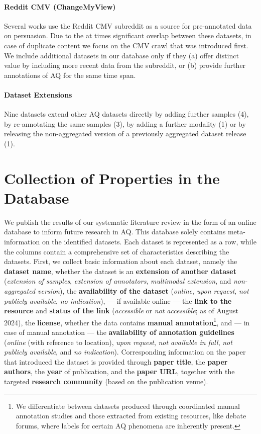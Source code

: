 \paragraph{Reddit CMV (ChangeMyView)}
Several works use the Reddit CMV subreddit as a source for pre-annotated data on persuasion. Due to the at times significant overlap between these datasets, in case of duplicate content we focus on the CMV crawl that was introduced first. We include additional datasets in our database only if they (a) offer distinct value by including more recent data from the subreddit, or (b) provide further annotations of AQ for the same time span.

\paragraph{Dataset Extensions}
Nine datasets extend other AQ datasets directly by adding further samples (4), by re-annotating the same samples (3), by adding a further modality (1) or by releasing the non-aggregated version of a previously aggregated dataset release (1).


\section{Collection of Properties in the Database}
\label{sec:database-details}

We publish the results of our systematic literature review in the form of an online database to inform future research in AQ. This database solely contains meta-information on the identified datasets. Each dataset is represented as a row, while the columns contain a comprehensive set of characteristics describing the datasets.
First, we collect basic information about each dataset, namely the \textbf{dataset name}, whether the dataset is an \textbf{extension of another dataset} (\textit{extension of samples}, \textit{extension of annotators}, \textit{multimodal extension}, and \textit{non-aggregated version}), the \textbf{availability of the dataset} (\textit{online}, \textit{upon request}, \textit{not publicly available}, \textit{no indication}), --- if available online --- the \textbf{link to the resource} and \textbf{status of the link} (\textit{accessible} or \textit{not accessible}; as of August 2024), the \textbf{license}, whether the data contains \textbf{manual annotation}\footnote{We differentiate between datasets produced through coordinated manual annotation studies and those extracted from existing resources, like debate forums, where labels for certain AQ phenomena are inherently present.}, and --- in case of manual annotation --- the \textbf{availability of annotation guidelines} (\textit{online} (with reference to location), \textit{upon request}, \textit{not available in full}, \textit{not publicly available}, and \textit{no indication}).
Corresponding information on the paper that introduced the dataset is provided through \textbf{paper title}, the \textbf{paper authors}, the \textbf{year} of publication, and the \textbf{paper URL}, together with the targeted \textbf{research community} (based on the publication venue).

